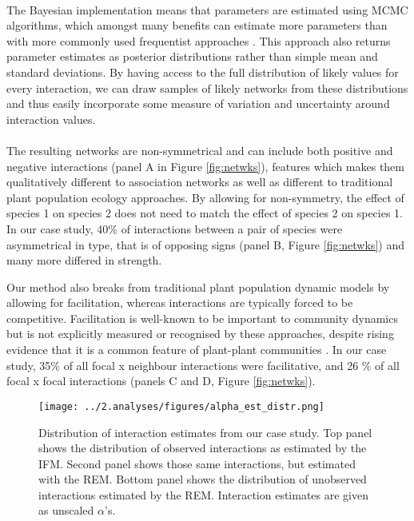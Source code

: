 \documentclass[a4,12pt]{article}
\begin{document}
    \paragraph{}
    The Bayesian implementation means that parameters are estimated using MCMC algorithms, which amongst many benefits can estimate more parameters than with more commonly used frequentist approaches \citep{Dorazio2016}. This approach also returns parameter estimates as posterior distributions rather than simple mean and standard deviations. By having access to the full distribution of likely values for every interaction, we can draw samples of likely networks from these distributions and thus easily incorporate some measure of variation and uncertainty around interaction values. %


    \paragraph{}
    The resulting networks are non-symmetrical and can include both positive and negative interactions (panel A in Figure \ref{fig:netwks}), features which makes them qualitatively different to association networks as well as different to traditional plant population ecology approaches. By allowing for non-symmetry, the effect of species 1 on species 2 does not need to match the effect of species 2 on species 1. In our case study, 40\% of interactions between a pair of species were asymmetrical in type, that is of opposing signs (panel B, Figure \ref{fig:netwks}) and many more differed in strength. 
    
    Our method also breaks from traditional plant population dynamic models by allowing for facilitation, whereas interactions are typically forced to be competitive. Facilitation is well-known to be important to community dynamics but is not explicitly measured or recognised by these approaches, despite rising evidence that it is a common feature of plant-plant communities \citep{Brooker2008a}. In our case study, 35\% of all focal x neighbour interactions were facilitative, and 26 \% of all focal x focal interactions (panels C and D, Figure \ref{fig:netwks}).



        \begin{figure}[H]
        \texttt{[image: ../2.analyses/figures/alpha\_est\_distr.png]}
        \caption{Distribution of interaction estimates from our case study. Top panel shows the distribution of observed interactions as estimated by the IFM. Second panel shows those same interactions, but estimated with the REM. Bottom panel shows the distribution of unobserved interactions estimated by the REM. Interaction estimates are given as unscaled \(\alpha\)'s.}
        \label{fig:adist}
    \end{figure}
\end{document}
